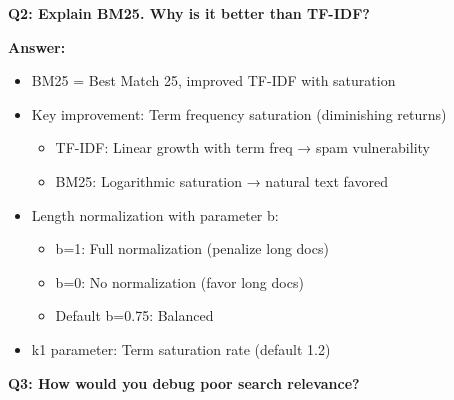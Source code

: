 \documentclass[10pt]{article}
\begin{document}
\textbf{Q2: Explain BM25. Why is it better than TF-IDF?}

\textbf{Answer:}
\begin{itemize}
\item BM25 = Best Match 25, improved TF-IDF with saturation
\item Key improvement: Term frequency saturation (diminishing returns)
  \begin{itemize}
  \item TF-IDF: Linear growth with term freq → spam vulnerability
  \item BM25: Logarithmic saturation → natural text favored
  \end{itemize}
\item Length normalization with parameter b:
  \begin{itemize}
  \item b=1: Full normalization (penalize long docs)
  \item b=0: No normalization (favor long docs)
  \item Default b=0.75: Balanced
  \end{itemize}
\item k1 parameter: Term saturation rate (default 1.2)
\end{itemize}

\textbf{Q3: How would you debug poor search relevance?}
\end{document}
